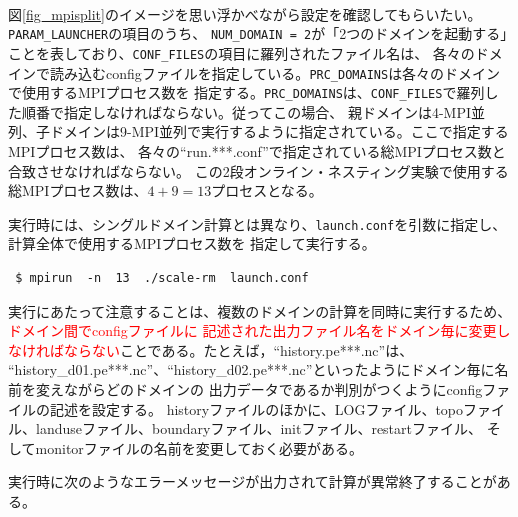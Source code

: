 \\

\noindent 図\ref{fig_mpisplit}のイメージを思い浮かべながら設定を確認してもらいたい。\verb|PARAM_LAUNCHER|の項目のうち、
\verb|NUM_DOMAIN = 2|が「2つのドメインを起動する」ことを表しており、\verb|CONF_FILES|の項目に羅列されたファイル名は、
各々のドメインで読み込むconfigファイルを指定している。\verb|PRC_DOMAINS|は各々のドメインで使用するMPIプロセス数を
指定する。\verb|PRC_DOMAINS|は、\verb|CONF_FILES|で羅列した順番で指定しなければならない。従ってこの場合、
親ドメインは4-MPI並列、子ドメインは9-MPI並列で実行するように指定されている。ここで指定するMPIプロセス数は、
各々の``run.***.conf''で指定されている総MPIプロセス数と合致させなければならない。
この2段オンライン・ネスティング実験で使用する総MPIプロセス数は、$4 + 9 = 13$プロセスとなる。

実行時には、シングルドメイン計算とは異なり、\verb|launch.conf|を引数に指定し、計算全体で使用するMPIプロセス数を
指定して実行する。
\begin{verbatim}
 $ mpirun  -n  13  ./scale-rm  launch.conf
\end{verbatim}

実行にあたって注意することは、複数のドメインの計算を同時に実行するため、\textcolor{red}{ドメイン間でconfigファイルに
記述された出力ファイル名をドメイン毎に変更しなければならない}ことである。たとえば，``history.pe***.nc''は、
``history\_d01.pe***.nc''、``history\_d02.pe***.nc''といったようにドメイン毎に名前を変えながらどのドメインの
出力データであるか判別がつくようにconfigファイルの記述を設定する。
historyファイルのほかに、LOGファイル、topoファイル、landuseファイル、boundaryファイル、initファイル、restartファイル、
そしてmonitorファイルの名前を変更しておく必要がある。

実行時に次のようなエラーメッセージが出力されて計算が異常終了することがある。\\

\\

